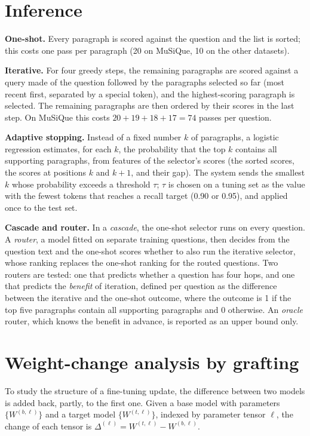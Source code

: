 \section{Inference}
\label{sec:method_inference}

\textbf{One-shot.} Every paragraph is scored against the question and the list is sorted; this costs one pass per paragraph (20 on MuSiQue, 10 on the other datasets).

\textbf{Iterative.} For four greedy steps, the remaining paragraphs are scored against a query made of the question followed by the paragraphs selected so far (most recent first, separated by a special token), and the highest-scoring paragraph is selected. The remaining paragraphs are then ordered by their scores in the last step. On MuSiQue this costs $20+19+18+17 = 74$ passes per question.

\textbf{Adaptive stopping.} Instead of a fixed number $k$ of paragraphs, a logistic regression estimates, for each $k$, the probability that the top $k$ contains all supporting paragraphs, from features of the selector's scores (the sorted scores, the scores at positions $k$ and $k{+}1$, and their gap). The system sends the smallest $k$ whose probability exceeds a threshold $\tau$; $\tau$ is chosen on a tuning set as the value with the fewest tokens that reaches a recall target (0.90 or 0.95), and applied once to the test set.

\textbf{Cascade and router.} In a \emph{cascade}, the one-shot selector runs on every question. A \emph{router}, a model fitted on separate training questions, then decides from the question text and the one-shot scores whether to also run the iterative selector, whose ranking replaces the one-shot ranking for the routed questions. Two routers are tested: one that predicts whether a question has four hops, and one that predicts the \emph{benefit} of iteration, defined per question as the difference between the iterative and the one-shot outcome, where the outcome is 1 if the top five paragraphs contain all supporting paragraphs and 0 otherwise. An \emph{oracle} router, which knows the benefit in advance, is reported as an upper bound only.

\section{Weight-change analysis by grafting}
\label{sec:method_graft}

To study the structure of a fine-tuning update, the difference between two models is added back, partly, to the first one. Given a base model with parameters $\{W^{(b,\ell)}\}$ and a target model $\{W^{(t,\ell)}\}$, indexed by parameter tensor $\ell$, the change of each tensor is $\Delta^{(\ell)}=W^{(t,\ell)}-W^{(b,\ell)}$.


